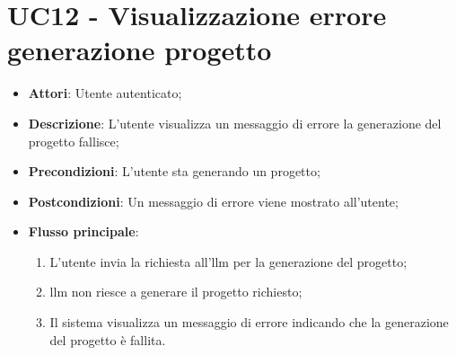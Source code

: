 \section*{UC12 - Visualizzazione errore generazione progetto}
\begin{itemize}
    \item \textbf{Attori}: Utente autenticato;
    \item \textbf{Descrizione}: L'utente visualizza un messaggio di errore la generazione del progetto fallisce;
    \item \textbf{Precondizioni}: L'utente sta generando un progetto;
    \item \textbf{Postcondizioni}: Un messaggio di errore viene mostrato all'utente;
    \item \textbf{Flusso principale}:
    \begin{enumerate}
        \item L'utente invia la richiesta all'\gls{llm} per la generazione del progetto;
        \item \gls{llm} non riesce a generare il progetto richiesto;
        \item Il sistema visualizza un messaggio di errore indicando che la generazione del progetto è fallita.
    \end{enumerate}
\end{itemize}

\vspace{0.5cm}  

